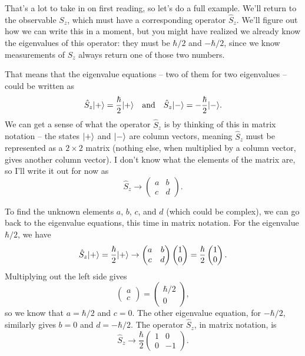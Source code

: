 That's a lot to take in on first reading, so let's do a full example.  We'll return to the observable $S_z$, which must have a corresponding operator $\hat{S}_z$.  We'll figure out how we can write this in a moment, but you might have realized we already know the eigenvalues of this operator: they must be $\hbar/2$ and $-\hbar/2$, since we know measurements of $S_z$ always return one of those two numbers.

That means that the eigenvalue equations -- two of them for two eigenvalues -- could be written as
\begin{equation}
\hat{S}_z | + \rangle = \frac{\hbar}{2} | + \rangle \quad \text{and} \quad \hat{S}_z | - \rangle = -\frac{\hbar}{2} | - \rangle.
\end{equation}
We can get a sense of what the operator $\hat{S}_z$ is by thinking of this in matrix notation -- the states $| + \rangle$ and $| - \rangle$ are column vectors, meaning $\hat{S}_z$ must be represented as a $2\times 2$ matrix (nothing else, when multiplied by a column vector, gives another column vector).  I don't know what the elements of the matrix are, so I'll write it out for now as
\[
\hat{S}_z \to \begin{pmatrix} a & b \\ c & d \end{pmatrix}.
\]

To find the unknown elements $a$, $b$, $c$, and $d$ (which could be complex), we can go back to the eigenvalue equations, this time in matrix notation.  For the eigenvalue $\hbar/2$, we have
\begin{equation}
\hat{S}_z | + \rangle = \frac{\hbar}{2} | + \rangle \to \begin{pmatrix} a & b \\ c & d \end{pmatrix} \begin{pmatrix} 1 \\ 0 \end{pmatrix} = \frac{\hbar}{2} \begin{pmatrix} 1 \\ 0 \end{pmatrix}.
\end{equation}
Multiplying out the left side gives
\[
\begin{pmatrix} a \\ c \end{pmatrix} = \begin{pmatrix} \hbar/2 \\ 0 \end{pmatrix},
\]
so we know that $a = \hbar/2$ and $c = 0$.  The other eigenvalue equation, for $-\hbar/2$, similarly gives $b = 0$ and $d = -\hbar/2$.  The operator $\hat{S}_z$, in matrix notation, is
\begin{equation}
\hat{S}_z \to \frac{\hbar}{2} \begin{pmatrix} 1 & 0 \\ 0 & -1 \end{pmatrix}.
\end{equation}

